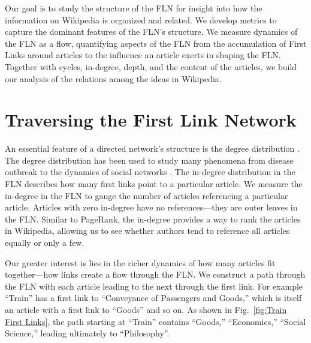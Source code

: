 \documentclass[pre,twocolumn,twoside,superscriptaddress,floatfix, aps, 10pt]{revtex4-1}
\begin{document}
Our goal is to study the structure of the FLN for insight into how the information on Wikipedia is organized and related.
We develop metrics to capture 
the dominant features of the FLN's structure.
We measure dynamics of the FLN as a flow, quantifying 
aspects of the FLN from the accumulation of First Links around articles 
to the influence an article exerts in shaping the FLN.
Together with cycles, in-degree, depth, and the content of the articles, 
we build our analysis of the relations among the ideas in Wikipedia.



\section{Traversing the First Link Network}

An essential feature of a directed network's structure is the degree distribution 
\cite{newman}. 
The degree distribution has been used to study many phenomena from disease outbreak 
\cite{disease} 
to the dynamics of social networks 
\cite{social_nets}.
The in-degree distribution in the FLN describes how many first links point to a 
particular article. 
We measure the in-degree in the FLN to gauge the number of articles referencing a particular article.
Articles with zero in-degree have no references---they are outer leaves in the FLN. 
Similar to PageRank, the in-degree 
provides a way to rank the articles in Wikipedia, allowing us to see 
whether authors tend to reference all articles equally or only a few.


Our greater interest is lies in the richer dynamics of how many articles fit together---how links create a flow through the FLN.
We construct a path through the FLN with each article 
leading to the next through the first link. 
For example ``Train'' has a first link to ``Conveyance of Passengers and Goods,'' which is itself
an article with a first link to ``Goods'' and so on. 
As shown in Fig.~\ref{fig:Train First Links}, the path starting at ``Train'' 
contains ``Goods,'' ``Economics,'' ``Social Science,''
leading ultimately to ``Philosophy''.
\end{document}
